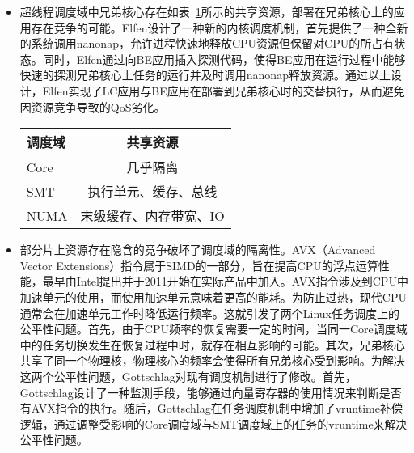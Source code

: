 \begin{itemize}
    \item 超线程调度域中兄弟核心存在如表~\ref{tab:resourcesharing}所示的共享资源，部署在兄弟核心上的应用存在竞争的可能。Elfen\citep{yang2016elfen}设计了一种新的内核调度机制，首先提供了一种全新的系统调用nanonap，允许进程快速地释放CPU资源但保留对CPU的所占有状态。同时，Elfen通过向BE应用插入探测代码，使得BE应用在运行过程中能够快速的探测兄弟核心上任务的运行并及时调用nanonap释放资源。通过以上设计，Elfen实现了LC应用与BE应用在部署到兄弟核心时的交替执行，从而避免因资源竞争导致的QoS劣化。 

    \begin{table}[!htbp]
        \label{tab:resourcesharing}
        \footnotesize%
        \setlength{\tabcolsep}{4pt}%
        \renewcommand{\arraystretch}{1.5}%
        \centering
        \begin{tabular}{lc}
            \hline
            调度域 & 共享资源\\
            \hline
            Core & 几乎隔离\\
            SMT & 执行单元、缓存、总线\\
            NUMA & 末级缓存、内存带宽、IO\\
            \hline
        \end{tabular}
    \end{table}

    \item 部分片上资源存在隐含的竞争破坏了调度域的隔离性。AVX（Advanced Vector Extensions）指令属于SIMD的一部分，旨在提高CPU的浮点运算性能，最早由Intel提出并于2011开始在实际产品中加入。AVX指令涉及到CPU中加速单元的使用，而使用加速单元意味着更高的能耗。为防止过热，现代CPU通常会在加速单元工作时降低运行频率。这就引发了两个Linux任务调度上的公平性问题\citep{gottschlag2020avx}。首先，由于CPU频率的恢复需要一定的时间，当同一Core调度域中的任务切换发生在恢复过程中时，就存在相互影响的可能。其次，兄弟核心共享了同一个物理核，物理核心的频率会使得所有兄弟核心受到影响。为解决这两个公平性问题，Gottschlag\citep{gottschlag2021fair}对现有调度机制进行了修改。首先，Gottschlag设计了一种监测手段，能够通过向量寄存器的使用情况来判断是否有AVX指令的执行。随后，Gottschlag在任务调度机制中增加了vruntime补偿逻辑，通过调整受影响的Core调度域与SMT调度域上的任务的vruntime来解决公平性问题。
\end{itemize}

